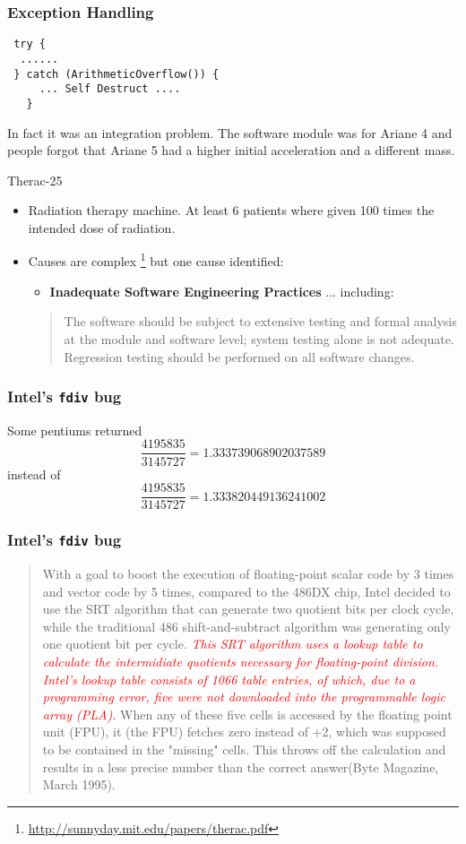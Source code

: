 \documentclass{beamer}
\begin{document}
\begin{frame}[fragile]
  \frametitle{Exception Handling}
\begin{lstlisting}
 try {
  ......
 } catch (ArithmeticOverflow()) {
     ... Self Destruct .... 
   } 
\end{lstlisting}
In fact it was an integration problem. The software module was for
Ariane 4 and people forgot that Ariane 5 had a higher initial
acceleration and a different mass.  
\end{frame}
\begin{frame}{Therac-25}
  \begin{itemize}
  \item  Radiation therapy machine. At least 6 patients where given
    100 times the intended dose of radiation. 
  \item Causes are complex
    \footnote{\url{http://sunnyday.mit.edu/papers/therac.pdf}} but one
    cause identified:
    \begin{itemize}
    \item      {\bf Inadequate Software Engineering Practices} ... including:
    \end{itemize}
    \begin{quote}
     The software should be subject to extensive testing and formal
     analysis at the module and software level; system testing alone
     is not adequate.  Regression testing should be performed on all
     software changes. 
    \end{quote}
  \end{itemize}  
\end{frame}
\begin{frame}
  \frametitle{Intel's {\tt fdiv} bug}
   
Some pentiums returned
\[
\frac{4195835}{3145727} = 1.333739068902037589
\]
instead of 
\[
\frac{4195835}{3145727} = 1.333820449136241002
\]

\end{frame}
\begin{frame}
  \frametitle{Intel's {\tt fdiv} bug}
  \begin{quote}
    With a goal to boost the execution of floating-point scalar code by 3
    times and vector code by 5 times, compared to the 486DX chip, Intel
    decided to use the SRT algorithm that can generate two quotient bits per
    clock cycle, while the traditional 486 shift-and-subtract algorithm was
    generating only one quotient bit per cycle. \textcolor{red}{\em This SRT
      algorithm uses a lookup table to calculate the intermidiate quotients
      necessary for floating-point division. Intel's lookup table consists of
      1066 table entries, of which, due to a programming error, five were not
      downloaded into the programmable logic array (PLA).} When any of these
    five cells is accessed by the floating point unit (FPU), it (the FPU)
    fetches zero instead of +2, which was supposed to be contained in the
    "missing" cells. This throws off the calculation and results in a less
    precise number than the correct answer(Byte Magazine, March 1995).
  \end{quote}
\end{frame}
\end{document}
